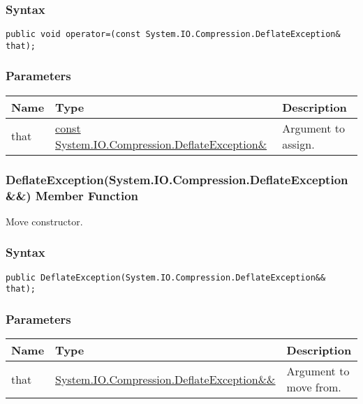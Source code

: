 \documentclass[a4paper,oneside,11.000000pt]{book}
\begin{document}
\subsubsection*{Syntax}
\texttt{public void operator=(const System.IO.Compression.DeflateException\& that);}
\subsubsection*{Parameters}
\begin{flushleft}
\begin{supertabular}[l]{!{\raggedright}p{1.30721cm}!{\raggedright}p{8.55945cm}!{\raggedright}p{4.89046cm}}
\textbf{Name}
& \textbf{Type}
& \textbf{Description}
\\
\hline
that
& \hyperlink{System.IO.Compression.DeflateException}{const System.\-IO.\-Compression.\-DeflateException\&\-}
& Argument to assign.

\\
\end{supertabular}

\end{flushleft}
\clearpage

\hypertarget{System.IO.Compression.DeflateException.constructor.P.System.IO.Compression.DeflateException.RR.System.IO.Compression.DeflateException}{\subsubsection*{DeflateException(System.IO.Compression.DeflateException\&\&) Member Function}}\begin{flushleft}
Move constructor.

\end{flushleft}
\subsubsection*{Syntax}
\texttt{public DeflateException(System.IO.Compression.DeflateException\&\& that);}
\subsubsection*{Parameters}
\begin{flushleft}
\begin{supertabular}[l]{!{\raggedright}p{1.30721cm}!{\raggedright}p{8.55945cm}!{\raggedright}p{4.93333cm}}
\textbf{Name}
& \textbf{Type}
& \textbf{Description}
\\
\hline
that
& \hyperlink{System.IO.Compression.DeflateException}{System.\-IO.\-Compression.\-DeflateException\&\-\&\-}
& Argument to move from.

\\
\end{supertabular}

\end{flushleft}
\clearpage
\end{document}
